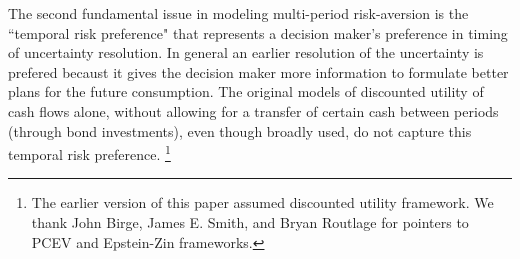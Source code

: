 \documentclass[mnsc,nonblindrev,copyedit]{informs2_wz} %
\newcommand{\OUT}[1]{}
\begin{document}
The second fundamental issue in modeling multi-period risk-aversion is the ``temporal risk preference" that represents a decision maker's preference in timing of uncertainty resolution. In general an earlier resolution of the uncertainty is prefered becaust it gives the decision maker more information to formulate better plans for the future consumption. The original models of discounted utility of cash flows alone, without allowing for a transfer of certain cash between periods (through bond investments), even though broadly used, do not capture this temporal risk preference.  \footnote{The earlier version of this paper assumed discounted utility framework.  We thank John Birge, James E. Smith, and Bryan Routlage for pointers to PCEV and Epstein-Zin frameworks.}  
\OUT{ *** I WOULD PARTLY USE THE LOGIC BELOW TO STRENGTHEN THE CASE FOR DISCOUNTED UTILITY AND THEN SAY WHAT WE DO. ***
 OmIT THE REST?: Prakash \cite{Prakash1976} shows that the consistence of preference across time can be completely determined if (1) The preference across time is specified by a continuous monotone function; and (2) the preference, at a fixed instant of time, is specified.  Fishburn {\it et al.} \cite{Fishburn1982} conclude that, if utility function is monotonic and continuous, then the resultant choice is consistent.  
}
\OUT{
Assuming stationary condition (that is, if $x$ at time $t$ is preferred over $y$ at time $t + k$, then $x$ at time $s$ is preferred over $y$ at time $s +k$), they show that the utility can be expressed as $U(x,t) = \alpha^t f(x)$, where $1>\alpha>0$ and $f$ is an increasing function.  They also present other forms of utility functions under conditions weaker than the stationarity.  
}
\end{document}
